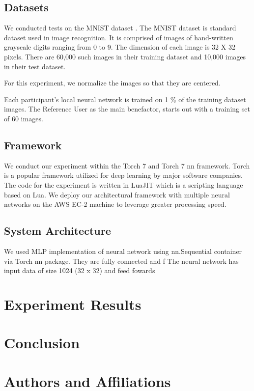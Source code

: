 \documentclass[conference]{IEEEtran}
\begin{document}
\subsection{Datasets}
We conducted tests on the MNIST dataset \cite{MNIST}. The MNIST dataset is standard dataset used in image recognition. It is comprised of images of hand-written grayscale digits ranging from 0 to 9. The dimension of each image is 32 X 32 pixels. There are 60,000 such images in their training dataset and 10,000 images in their test dataset.

For this experiment, we normalize the images so that they are centered.

Each participant's local neural network is trained on 1 \% of the training dataset images. 
The Reference User as the main benefactor, starts out with a training set of 60 images.

\subsection{Framework}
We conduct our experiment within the Torch 7 and Torch 7 nn framework. Torch is a popular framework utilized for deep learning by major software companies. The code for the experiment is written in LuaJIT which is a scripting language based on Lua. 
We deploy our architectural framework with multiple neural networks on the AWS EC-2 machine to leverage greater processing speed.

\subsection{System Architecture}
We used MLP implementation of neural network using nn.Sequential container via Torch nn package. They are fully connected and f  
The neural network has input data of size 1024 (32 x 32) and feed fowards



\section{Experiment Results}

\section{Conclusion}


\section{Authors and Affiliations}
\end{document}
